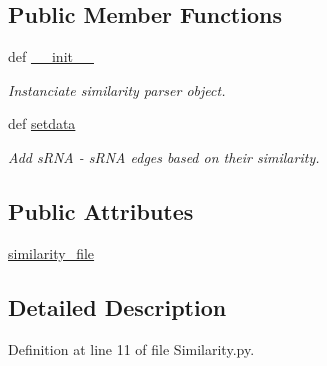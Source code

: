 \subsection*{\-Public \-Member \-Functions}
\begin{DoxyCompactItemize}
\item 
def \hyperlink{classirna_1_1David2tulip_1_1Similarity_1_1Similarity_a56d7d59fd7bc28af8f8d78fcf1e1f7ed}{\-\_\-\-\_\-init\-\_\-\-\_\-}
\begin{DoxyCompactList}\small\item\em \-Instanciate similarity parser object. \end{DoxyCompactList}\item 
def \hyperlink{classirna_1_1David2tulip_1_1Similarity_1_1Similarity_a0d301f792902afc009c1a3b0f3765b0b}{setdata}
\begin{DoxyCompactList}\small\item\em \-Add s\-R\-N\-A -\/ s\-R\-N\-A edges based on their similarity. \end{DoxyCompactList}\end{DoxyCompactItemize}
\subsection*{\-Public \-Attributes}
\begin{DoxyCompactItemize}
\item 
\hyperlink{classirna_1_1David2tulip_1_1Similarity_1_1Similarity_a3b7f3b913600221d5f7a735f147a8d29}{similarity\-\_\-file}
\end{DoxyCompactItemize}


\subsection{\-Detailed \-Description}


\-Definition at line 11 of file \-Similarity.\-py.



